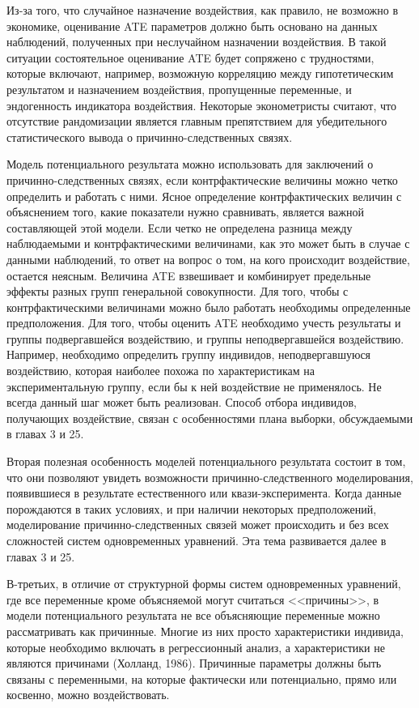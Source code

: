 	
Из-за того, что случайное назначение воздействия, как правило, не  возможно в экономике, оценивание ATE параметров должно быть основано на данных наблюдений, полученных при неслучайном назначении воздействия. 
В такой ситуации состоятельное оценивание ATE будет сопряжено с трудностями, которые включают, например, возможную корреляцию между гипотетическим результатом и назначением воздействия, пропущенные переменные, и эндогенность индикатора воздействия. Некоторые эконометристы считают, что отсутствие рандомизации является главным препятствием для убедительного статистического вывода о причинно-следственных связях.
	
	
Модель потенциального результата можно использовать для заключений о причинно-следственных связях, если контрфактические величины можно четко определить и работать с ними.
Ясное определение контрфактических величин с объяснением того, какие показатели нужно сравнивать, является важной составляющей этой модели. Если четко не определена разница  между наблюдаемыми и контрфактическими величинами,  как это может быть в случае с данными наблюдений, то ответ на вопрос о том, на кого происходит воздействие, остается неясным. 
Величина ATE взвешивает и комбинирует предельные эффекты разных групп генеральной совокупности. Для того, чтобы с контрфактическими величинами можно было работать необходимы определенные предположения. Для того, чтобы оценить ATE необходимо учесть результаты и группы подвергавшейся воздействию, и группы неподвергавшейся воздействию.
Например, необходимо определить группу индивидов, неподвергавшуюся воздействию, которая наиболее похожа по характеристикам на экспериментальную группу, если бы к ней воздействие не применялось. Не всегда данный шаг может быть реализован.
Способ отбора индивидов, получающих воздействие, связан с особенностями плана выборки, обсуждаемыми в главах 3 и 25.

	
	
Вторая полезная особенность моделей потенциального результата состоит в том, что они позволяют увидеть  возможности причинно-следственного моделирования, появившиеся в результате естественного или квази-эксперимента. Когда данные порождаются в таких условиях, и при наличии некоторых предположений,  моделирование причинно-следственных связей  может происходить и без всех сложностей систем одновременных уравнений. Эта тема развивается далее в главах 3 и 25.

	В-третьих, в отличие от структурной формы систем одновременных уравнений, где все переменные кроме объясняемой могут считаться <<причины>>, в модели потенциального результата не все объясняющие переменные можно рассматривать как причинные. Многие из них просто характеристики индивида, которые необходимо включать в регрессионный анализ, а характеристики не являются причинами (Холланд, 1986). Причинные параметры должны быть связаны с переменными, на которые фактически или потенциально, прямо или косвенно, можно воздействовать.
	
